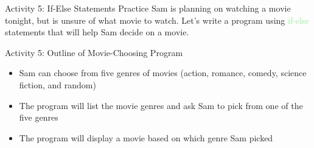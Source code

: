 \documentclass[hyperref={pdfpagemode=FullScreen},aspectratio=169]{beamer}
\begin{document}
  \begin{frame}{Activity 5: If-Else Statements Practice}
    Sam is planning on watching a movie tonight, but is unsure of what movie to watch. Let's write a program using \textcolor{lightGreen}{if-else} statements that will help Sam decide on a movie. 
  \end{frame}

  \begin{frame}{Activity 5: Outline of Movie-Choosing Program}
    \begin{itemize}
      \item Sam can choose from five genres of movies (action, romance, comedy, science fiction, and random)
      \item The program will list the movie genres and ask Sam to pick from one of the five genres
      \item The program will display a movie based on which genre Sam picked
    \end{itemize}
  \end{frame}
\end{document}

